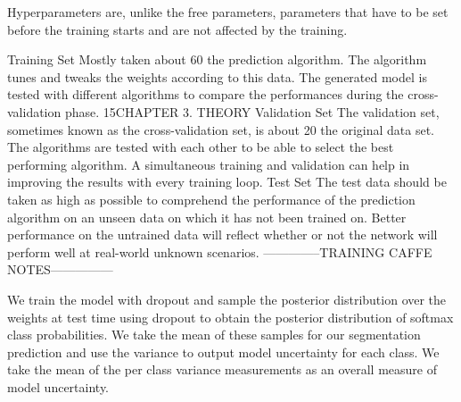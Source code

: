 Hyperparameters are, unlike the free parameters, parameters that have to be set before the training
starts and are not affected by the training.

Training Set
Mostly taken about 60%
the prediction algorithm. The algorithm tunes and tweaks the weights according to
this data. The generated model is tested with different algorithms to compare the
performances during the cross-validation phase.
15CHAPTER 3. THEORY
Validation Set
The validation set, sometimes known as the cross-validation set, is about 20%
the original data set. The algorithms are tested with each other to be able to select
the best performing algorithm. A simultaneous training and validation can help in
improving the results with every training loop.
Test Set
The test data should be taken as high as possible to comprehend the performance
of the prediction algorithm on an unseen data on which it has not been trained on.
Better performance on the untrained data will reflect whether or not the network
will perform well at real-world unknown scenarios.
--------------TRAINING CAFFE NOTES---------------

We train the model with dropout and sample the posterior distribution over the weights at test time using dropout
to obtain the posterior distribution of softmax class probabilities. We take the mean of these samples for our segmentation prediction and use the variance to output model uncertainty for each class. We take the mean of the per class variance measurements as an overall measure of model uncertainty.